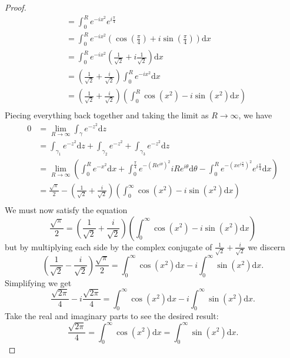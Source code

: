 \documentclass{article}
\begin{document}
\begin{proof}
\begin{align*}
  &= \int_0^R e^{-ix^2}e^{i \frac{\pi}{4}}\\
  &= \int_0^R e^{-ix^2} \left(\cos \left(\frac{\pi}{4} \right) + i \sin \left(\frac{\pi}{4} \right) \right) \mathrm{d}x \\
  &= \int_0^R e^{-ix^2}\left(\frac{1}{\sqrt{2}} + i \frac{1}{\sqrt{2}} \right) \mathrm{d}x \\
  &= \left(\frac{1}{\sqrt{2}} + \frac{i}{\sqrt{2}} \right) \int_0^R e^{-ix^2} \mathrm{d}x \\
  &= \left(\frac{1}{\sqrt{2}} + \frac{i}{\sqrt{2}} \right) \left(\int_0^R \cos \left(x^2 \right) - i\sin\left(x^2\right) \mathrm{d}x \right) \\
\end{align*}
Piecing everything back together and taking the limit as $R \to \infty$, we have 
\begin{align*}
 0  &= \lim\limits_{R \to \infty}\int_{\gamma}e^{-z^2} \mathrm{d}z\\ &= \int_{\gamma_1}e^{-z^2} \mathrm{d}z + \int_{\gamma_2}e^{-z^2} + \int_{\gamma_3}e^{-z^2} \mathrm{d}z \\ 
& =\lim\limits_{R \to \infty} \left( \int_0^R e^{-x^2} \mathrm{d}x + \int_0^{\frac{\pi}{4}} e^{-\left(Re^{i\theta} \right)^2}iRe^{i \theta}  \mathrm{d} \theta - \int_0^Re^{-\left(xe^{i \frac{\pi}{4}}\right)^2}e^{i \frac{\pi}{4}} \mathrm{d}x \right) \\
&= \frac{\sqrt{\pi}}{2} - \left(\frac{1}{\sqrt{2}} + \frac{i}{\sqrt{2}} \right) \left(\int_0^{\infty} \cos \left(x^2 \right) - i\sin\left(x^2\right) \mathrm{d}x \right) \\
\end{align*}
We must now satisfy the equation
\[
 \frac{\sqrt{\pi}}{2} = \left(\frac{1}{\sqrt{2}} + \frac{i}{\sqrt{2}} \right) \left(\int_0^{\infty} \cos \left(x^2 \right) - i\sin\left(x^2\right) \mathrm{d}x \right)
\]
but by multiplying each side by the complex conjugate of $\frac{1}{\sqrt{2}} + \frac{i}{\sqrt{2}}$ we discern 
\[
  \left(\frac{1}{\sqrt{2}} - \frac{i}{\sqrt{2}} \right) \frac{\sqrt{\pi}}{2} = \int_0^{\infty} \cos \left(x^2 \right)\mathrm{d}x - i\int_0^{\infty}\sin\left(x^2\right) \mathrm{d}x.
\]
Simplifying we get
\[
 \frac{\sqrt{2\pi}}{4} -i\frac{\sqrt{2 \pi}}{4} = \int_0^{\infty} \cos \left(x^2 \right)\mathrm{d}x - i\int_0^{\infty}\sin\left(x^2\right) \mathrm{d}x.
\]
Take the real and imaginary parts to see the desired result:
\[
  \frac{\sqrt{2\pi}}{4} = \int_0^{\infty} \cos \left(x^2 \right)\mathrm{d}x = \int_0^{\infty} \sin\left(x^2 \right)\mathrm{d}x.
\]
\end{proof}
\end{document}

